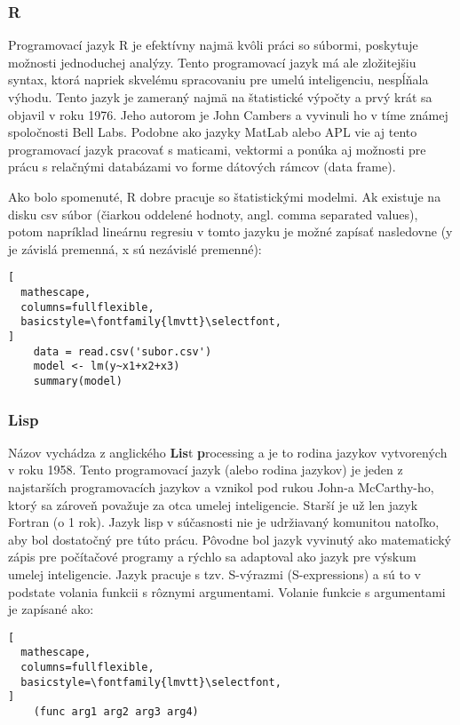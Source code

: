 \subsubsection{R}

Programovací jazyk R je efektívny najmä kvôli práci so súbormi, poskytuje možnosti jednoduchej analýzy.
Tento programovací jazyk má ale zložitejšiu syntax, ktorá napriek skvelému spracovaniu pre umelú inteligenciu,
nespĺňala výhodu.
Tento jazyk je zameraný najmä na štatistické výpočty a prvý krát sa objavil v roku 1976.\cite{lang_r}
Jeho autorom je John Cambers a vyvinuli ho v tíme známej spoločnosti Bell Labs.
Podobne ako jazyky MatLab alebo APL vie aj tento programovací jazyk pracovať s maticami, vektormi a ponúka aj možnosti
pre prácu s relačnými databázami vo forme dátových rámcov (data frame).

Ako bolo spomenuté, R dobre pracuje so štatistickými modelmi.
Ak existuje na disku csv súbor (čiarkou oddelené hodnoty, angl. comma separated values), potom napríklad lineárnu
regresiu v tomto jazyku je možné zapísať nasledovne (y je závislá premenná, x sú nezávislé premenné):
\begin{lstlisting}[
  mathescape,
  columns=fullflexible,
  basicstyle=\fontfamily{lmvtt}\selectfont,
]
    data = read.csv('subor.csv')
    model <- lm(y~x1+x2+x3)
    summary(model)
\end{lstlisting}

\subsubsection{Lisp}

Názov vychádza z anglického \textbf{Lis}t \textbf{p}rocessing a je to rodina jazykov vytvorených v roku 1958.
Tento programovací jazyk (alebo rodina jazykov) je jeden z najstarších programovacích jazykov a vznikol pod rukou
John-a McCarthy-ho, ktorý sa zároveň považuje za otca umelej inteligencie.\cite{father_of_ai}
Starší je už len jazyk Fortran (o 1 rok).
Jazyk lisp v súčasnosti nie je udržiavaný komunitou natoľko, aby bol dostatočný pre túto prácu.
Pôvodne bol jazyk vyvinutý ako matematický zápis pre počítačové programy a rýchlo sa adaptoval ako jazyk pre
výskum umelej inteligencie.
Jazyk pracuje s tzv. S-výrazmi (S-expressions) a sú to v podstate volania funkcii s rôznymi argumentami.
Volanie funkcie  s argumentami  je zapísané ako:
\begin{lstlisting}[
  mathescape,
  columns=fullflexible,
  basicstyle=\fontfamily{lmvtt}\selectfont,
]
    (func arg1 arg2 arg3 arg4)
\end{lstlisting}


